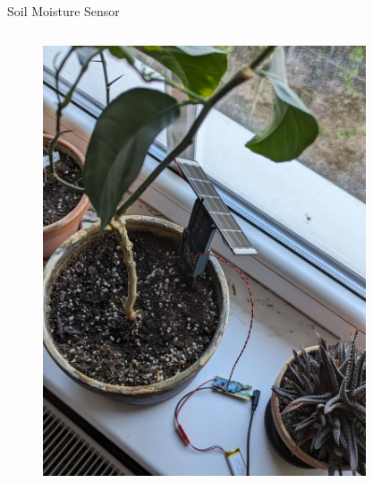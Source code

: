 \documentclass{beamer}
\begin{document}
\begin{frame}{Soil Moisture Sensor}
\begin{columns}[T]
\begin{column}{.5\textwidth}
    \begin{figure}
        \centering
        \includegraphics[width=\linewidth]{../thesis/img/sensor-deploy-up.jpg}
    \end{figure}
\end{column}
\hfil
\begin{column}{.5\textwidth}
    \begin{figure}
        \centering

\end{figure}
\end{column}
\end{columns}
\end{frame}
\end{document}
